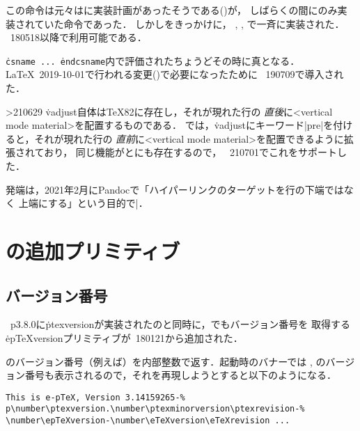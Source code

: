 \documentclass[a4paper,11pt,nomag,dvipdfmx]{jsarticle}
\begin{document}
\begin{cslist}
  この命令は元々はに実装計画があったそうである(\cite{expanded})が，
  しばらくの間にのみ実装されていた命令であった．
  しかし\cite{expanded1}をきっかけに，
  , \epTeX, で一斉に実装された．
  \epTeX~180518以降で利用可能である．

 \csitem[\.{ifincsname}]
  \texttt{\.{csname}~...~\.{endcsname}}内で評価されたちょうどその時に真となる．
  \LaTeX~2019-10-01で行われる変更(\cite{latex95,tjb83})で必要になったために
  \epTeX~190709で導入された．

\ifnum\epTeXversion>210629
  \.{vadjust}自体は\TeX82に存在し，それが現れた行の
  \emph{直後}に<vertical mode material>を配置するものである．
  では，\.{vadjust}にキーワード|pre|を付けると，それが現れた行の
  \emph{直前}に<vertical mode material>を配置できるように拡張されており，
  同じ機能がとにも存在するので，
  \epTeX~210701でこれをサポートした．

  発端は，2021年2月にPandocで「ハイパーリンクのターゲットを行の下端ではなく
  上端にする」という目的で|．
\fi
\end{cslist}


\section{\epTeX の追加プリミティブ}

\subsection{バージョン番号}
\pTeX~p3.8.0に\.{ptexversion}が実装されたのと同時に，\epTeX でもバージョン番号を
取得する\.{epTeXversion}プリミティブが\epTeX~180121から追加された．

\begin{cslist}
  \epTeX のバージョン番号（例えば\the\epTeXversion）を内部整数で返す．\epTeX 起動時のバナーでは
  \eTeX, \pTeX のバージョン番号も表示されるので，それを再現しようとすると以下のようになる．
\begin{verbatim}
This is e-pTeX, Version 3.14159265-%
p\number\ptexversion.\number\ptexminorversion\ptexrevision-%
\number\epTeXversion-\number\eTeXversion\eTeXrevision ...
\end{verbatim}
\end{cslist}
\end{document}
